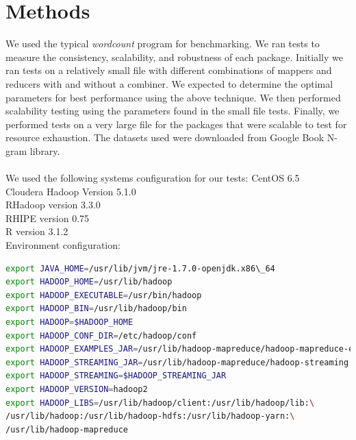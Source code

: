 \documentclass[
journal=jacsat, %
manuscript=article]{achemso}
\begin{document}
\section{Methods}
We used the typical \textit{wordcount} program for benchmarking. We ran tests to measure the consistency, scalability, and robustness of each package. Initially we ran tests on a relatively small file with different combinations of mappers and reducers with and without a combiner. We expected to determine the optimal parameters for best performance using the above technique. We then performed scalability testing using the parameters found in the small file tests. Finally, we performed tests on a very large file for the packages that were scalable to test for resource exhaustion. 
The datasets used were downloaded from Google Book N-gram library. ~\cite{GoogleNGram} \\ \\We used the following systems configuration for our tests:
\newline
CentOS 6.5 \\
Cloudera Hadoop Version 5.1.0 \\ 
RHadoop version 3.3.0\\
RHIPE version 0.75\\
R version 3.1.2
\\
Environment configuration:  \\
\begin{lstlisting}[language=bash, caption=\~/.bashrc]
export JAVA_HOME=/usr/lib/jvm/jre-1.7.0-openjdk.x86\_64 
export HADOOP_HOME=/usr/lib/hadoop 
export HADOOP_EXECUTABLE=/usr/bin/hadoop 
export HADOOP_BIN=/usr/lib/hadoop/bin 
export HADOOP=$HADOOP_HOME 
export HADOOP_CONF_DIR=/etc/hadoop/conf 
export HADOOP_EXAMPLES_JAR=/usr/lib/hadoop-mapreduce/hadoop-mapreduce-examples.jar
export HADOOP_STREAMING_JAR=/usr/lib/hadoop-mapreduce/hadoop-streaming.jar 
export HADOOP_STREAMING=$HADOOP_STREAMING_JAR 
export HADOOP_VERSION=hadoop2
export HADOOP_LIBS=/usr/lib/hadoop/client:/usr/lib/hadoop/lib:\
/usr/lib/hadoop:/usr/lib/hadoop-hdfs:/usr/lib/hadoop-yarn:\
/usr/lib/hadoop-mapreduce
\end{lstlisting}
\end{document}
